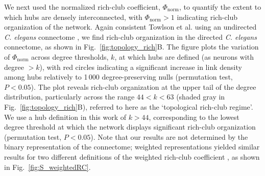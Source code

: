 \documentclass[10pt,letterpaper]{article}
\begin{document}
We next used the normalized rich-club coefficient, $\Phi_\mathrm{norm}$, to quantify the extent to which hubs are densely interconnected, with $\Phi_\mathrm{norm} > 1$ indicating rich-club organization of the network.
Again consistent Towlson et al. using an undirected \emph{C. elegans} connectome \cite{Towlson:2013gf}, we find rich-club organization in the directed \emph{C. elegans} connectome, as shown in Fig.~\ref{fig:topology_rich}B.
The figure plots the variation of $\Phi_\mathrm{norm}$ across degree thresholds, $k$, at which hubs are defined (as neurons with degree $>k$), with red circles indicating a significant increase in link density among hubs relatively to 1\,000 degree-preserving nulls (permutation test, $P < 0.05$).
The plot reveals rich-club organization at the upper tail of the degree distribution, particularly across the range $44 < k < 63$ (shaded gray in Fig.~\ref{fig:topology_rich}B), referred to here as the `topological rich-club regime'.
We use a hub definition in this work of $k > 44$, corresponding to the lowest degree threshold at which the network displays significant rich-club organization (permutation test, $P < 0.05$).
Note that our results are not determined by the binary representation of the connectome; weighted representations yielded similar results for two different definitions of the weighted rich-club coefficient \cite{Opsahl2008}, as shown in Fig.~\ref{fig:S_weightedRC}.
\end{document}
